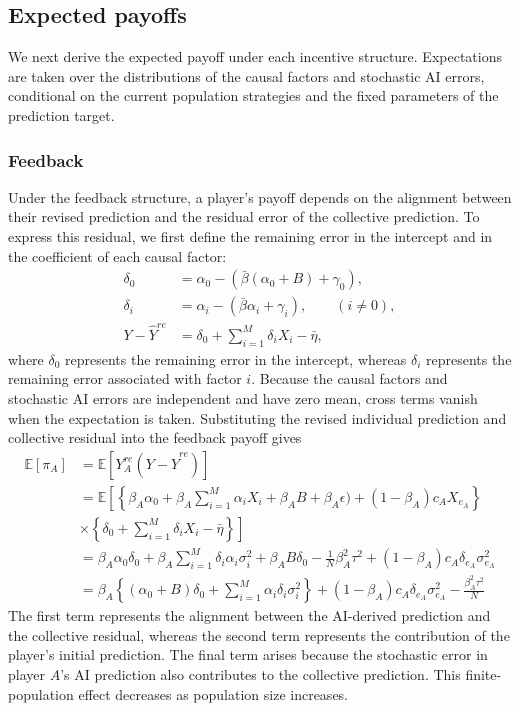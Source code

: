 \documentclass[12pt]{article}
\begin{document}
\subsection*{Expected payoffs}

We next derive the expected payoff under each incentive structure. 
Expectations are taken over the distributions of the causal factors and stochastic AI errors, conditional on the current population strategies and the fixed parameters of the prediction target.

\subsubsection*{Feedback}

Under the feedback structure, a player's payoff depends on the alignment between their revised prediction and the residual error of the collective prediction. 
To express this residual, we first define the remaining error in the intercept and in the coefficient of each causal factor:
\begin{align}
\delta_0 &= \alpha_0- (\bar{\beta}(\alpha_0 + B) + \gamma_0),\\
\delta_i &= \alpha_i- (\bar{\beta}\alpha_i + \gamma_i), \qquad (i \neq 0),\\
Y - \hat{Y}^{re} &= \delta_0 + \sum_{i = 1}^{M}\delta_iX_i - \bar{\eta},
\end{align}
where $\delta_0$ represents the remaining error in the intercept, whereas $\delta_i$ represents the remaining error associated with factor $i$. 
Because the causal factors and stochastic AI errors are independent and have zero mean, cross terms vanish when the expectation is taken. Substituting the revised individual prediction and collective residual into the feedback payoff gives
\begin{align}
\mathbb{E}[\pi_A]
&= \mathbb{E}[Y_A^{re}(Y - \hat{Y}^{re})] \\
&= \mathbb{E}\left[\left\{\beta_A \alpha_0 + \beta_A \sum_{i = 1}^{M} \alpha_i X_i + \beta_A B  + \beta_A \epsilon) + (1 - \beta_A)c_AX_{e_A}\right\}\right.\\
&\times \left.\left\{\delta_0 + \sum_{i = 1}^{M}\delta_iX_i - \bar{\eta}\right\}\right] \\
&= \beta_A\alpha_0\delta_0 + \beta_A\sum_{i = 1}^{M}\delta_i\alpha_i\sigma_i^2 + \beta_AB\delta_0 - \frac{1}{N}\beta_A^2\tau^2 + (1-\beta_A)c_A\delta_{e_A}\sigma_{e_A}^2\\
&= \beta_A\left\{(\alpha_0+B)\delta_0 + \sum_{i = 1}^{M}\alpha_i\delta_i\sigma_i^2\right\} + (1-\beta_A)c_A\delta_{e_A}\sigma_{e_A}^2 - \frac{\beta_A^2\tau^2}{N}
\end{align}
The first term represents the alignment between the AI-derived prediction and the collective residual, whereas the second term represents the contribution of the player's initial prediction. The final term arises because the stochastic error in player $A$'s AI prediction also contributes to the collective prediction. This finite-population effect decreases as population size increases.
\end{document}

